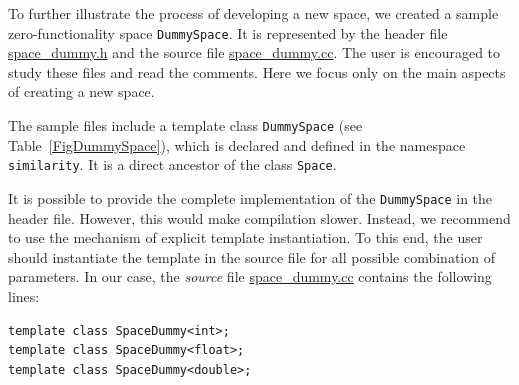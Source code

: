 \documentclass[runningheads,a4paper]{llncs}
\newcommand{\replocfile}{https://github.com/searchivarius/NonMetricSpaceLib/blob/pserv/}
\newcommand{\ttt}[1]{\texttt{#1}}
\begin{document}
To further illustrate the process of developing a new space,
we created a sample zero-functionality space \ttt{DummySpace}.
It is represented by 
the header file 
\href{\replocfile  similarity_search/include/space/space_dummy.h}{space\_dummy.h}
and the source file
\href{\replocfile similarity_search/src/space/space_dummy.cc}{space\_dummy.cc}.
The user is encouraged to study these files and read the comments.
Here we focus only on the main aspects of creating a new space.

The sample files include a template class \ttt{DummySpace} (see Table~\ref{FigDummySpace}), 
which is declared and defined in the namespace \ttt{similarity}.
It is a direct ancestor of the class \ttt{Space}.

It is possible to provide the complete implementation of the \ttt{DummySpace}
in the header file. However, this would make compilation slower.
Instead, we recommend to use the mechanism of explicit template instantiation.
To this end, the user should instantiate the template in the source file
for all possible combination of parameters.
In our case, the \emph{source} file 
\href{\replocfile similarity_search/src/space/space_dummy.cc}{space\_dummy.cc}
contains the following lines:
\begin{verbatim}
template class SpaceDummy<int>;
template class SpaceDummy<float>;
template class SpaceDummy<double>;
\end{verbatim}
\end{document}

